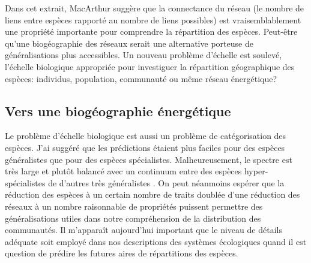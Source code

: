 Dans cet extrait, MacArthur suggère que la connectance du réseau (le
nombre de liens entre espèces rapporté au nombre de liens possibles) est
vraisemblablement une propriété importante pour comprendre la
répartition des espèces. Peut-être qu'une biogéographie des réseaux
serait une alternative porteuse de généralisations plus accessibles. Un
nouveau problème d'échelle est soulevé, l'échelle biologique appropriée
pour investiguer la répartition géographique des espèces: individus,
population, communauté ou même réseau énergétique?

\subsection*{Vers une biogéographie
énergétique}\label{vers-une-bioguxe9ographie-uxe9nerguxe9tique}

Le problème d'échelle biologique est aussi un problème de catégorisation
des espèces. J'ai suggéré que les prédictions étaient plus faciles pour
des espèces généralistes que pour des espèces spécialistes.
Malheureusement, le spectre est très large et plutôt balancé avec un
continuum entre des espèces hyper-spécialistes de d'autres très
généralistes \citep{Poisot2015c}. On peut néanmoins espérer que la
réduction des espèces à un certain nombre de traits
\citep{McGill2006, Poisot2015} doublée d'une réduction des réseaux à un
nombre raisonnable de propriétés puissent permettre des généralisations
utiles dans notre compréhension de la distribution des communautés. Il
m'apparaît aujourd'hui important que le niveau de détails adéquate soit
employé dans nos descriptions des systèmes écologiques quand il est
question de prédire les futures aires de répartitions des espèces.

